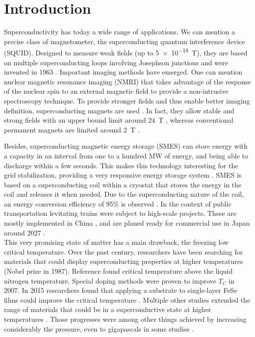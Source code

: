 \documentclass[../main.tex]{subfile}
\begin{document}
\section{Introduction}

Superconductivity has today a wide range of applications. We can mention a precise class of magnetometer, the superconducting quantum interference device (SQUID).
Designed to measure weak fields (up to \SI{5e-18}{\tesla})\cite{Range2004}, they are based on multiple superconducting loops involving Josephson junctions and were invented
in 1963 \cite{JAKLEVIC1964}.
Important imaging methods have emerged. One can mention nuclear magnetic resonance imaging (NMRI) that takes advantage of the response of the nuclear spin to an external 
magnetic field to provide a non-intrusive spectroscopy technique. To provide stronger fields and thus enable better imaging definition, superconducting magnets are used \cite{Nakamura2015}. In fact, they
allow stable and strong fields with an upper bound limit around \SI{24}{\tesla} \cite{Hashi2015}, whereas conventional permanent magnets are limited around \SI{2}{\tesla} \cite{Haishi2005}.

Besides, superconducting magnetic energy storage (SMES) can store energy with a capacity in an interval from one to a hundred \si{\mega\watt} of energy, and being able to discharge within a few seconds. This makes
this technology interesting for the grid stabilization, providing a very responsive energy storage system \cite{Tixador2008}.
SMES is based on a superconducting coil within a cryostat that stores the energy in the coil and releases it when needed. Due to the superconducting nature of the coil,
an energy conversion efficiency of 95\% is observed \cite{Tixador2008}.
In the context of public transportation levitating trains were subject to high-scale projects.
 These are mostly implemented in China \cite{Roque2024}, and are planed ready for commercial use in Japan around 2027 \cite{Nishijima2013}.\\

This very promising state of matter has a main drawback, the freezing low critical temperature. Over the past century, researchers 
have been searching for materials that could display superconducting properties at higher temperatures \cite{Bednorz1986} (Nobel prize in 1987).
Reference \cite{PhysRevLett.58.908} found critical temperature above the liquid nitrogen temperature.
Special doping methods were proven to improve $T_C$ \cite{Doiron-Leyraud2007} in 2007.
In 2015 researchers found that applying a substrate to single-layer FeSe films could improve the critical temperature \cite{Ge2015}.
Multiple other studies extended the range of materials that could be in a superconductive state at higher temperatures \cite{Einaga2016}\cite{Drozdov_2019} \cite{lee2023}.
Those progresses were among other things achieved by increasing considerably the pressure, even to gigapascals in some studies \cite{Drozdov_2019}.\\
\end{document}

